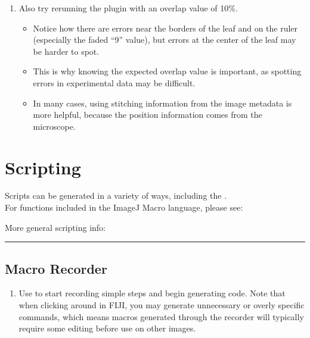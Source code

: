 \documentclass[letterpaper,10pt,english]{jupyterBook}
\begin{document}
\sphinxAtStartPar
{}
\begin{enumerate}
%
\setcounter{enumi}{2}
\item {} 
\sphinxAtStartPar
Also try re\sphinxhyphen{}running the plugin with an overlap value of 10\%.
\begin{itemize}
\item {} 
\sphinxAtStartPar
Notice how there are errors near the borders of the leaf and on the ruler (especially the faded “9” value), but errors at the center of the leaf may be harder to spot.

\item {} 
\sphinxAtStartPar
This is why knowing the expected overlap value is important, as spotting errors in experimental data may be difficult.

\item {} 
\sphinxAtStartPar
In many cases, using stitching information from the image metadata is more helpful, because the position information comes from the microscope.

\end{itemize}

\end{enumerate}

\sphinxstepscope


\chapter{Scripting}
\label{\detokenize{basic-scripting:scripting}}\label{\detokenize{basic-scripting::doc}}
\sphinxAtStartPar
Scripts can be generated in a variety of ways, including the .\\
For functions included in the ImageJ Macro language, please see:\\

\sphinxAtStartPar
More general scripting info:\\


\bigskip\hrule\bigskip



\section{Macro Recorder}
\label{\detokenize{basic-scripting:macro-recorder}}
\sphinxAtStartPar
{}
\begin{enumerate}
%
\item {} 
\sphinxAtStartPar
Use  to start recording simple steps and begin generating code.
Note that when clicking around in FIJI, you may generate unnecessary or overly specific commands, which means macros generated through the recorder will typically require some editing before use on other images.

\end{enumerate}
\end{document}
